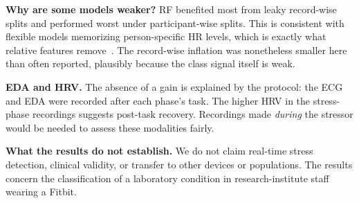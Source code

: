 \documentclass[conference]{IEEEtran}
\begin{document}
\textbf{Why are some models weaker?} RF benefited most from leaky record-wise splits and performed worst under participant-wise splits. This is consistent with flexible models memorizing person-specific HR levels, which is exactly what relative features remove~\cite{saeb2017usecase}. The record-wise inflation was nonetheless smaller here than often reported, plausibly because the class signal itself is weak.

\textbf{EDA and HRV.} The absence of a gain is explained by the protocol: the ECG and EDA were recorded after each phase's task. The higher HRV in the stress-phase recordings suggests post-task recovery. Recordings made \emph{during} the stressor would be needed to assess these modalities fairly.

\textbf{What the results do not establish.} We do not claim real-time stress detection, clinical validity, or transfer to other devices or populations. The results concern the classification of a laboratory condition in research-institute staff wearing a Fitbit.

\end{document}
